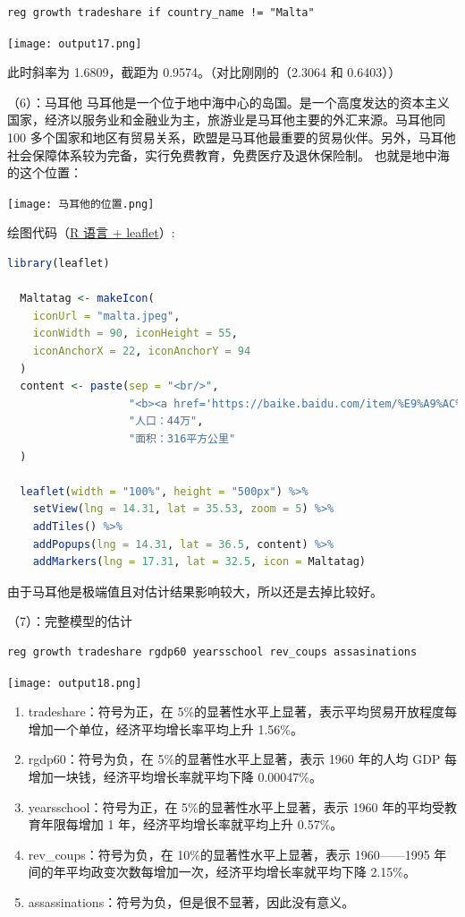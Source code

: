 \documentclass[cn,fancy,blue,11pt]{elegantbook}
\begin{document}
\begin{lstlisting}
reg growth tradeshare if country_name != "Malta"
\end{lstlisting}

\noindent\texttt{[image: output17.png]}

此时斜率为 1.6809，截距为 0.9574。（对比刚刚的（2.3064 和 0.6403））

（6）：马耳他
马耳他是一个位于地中海中心的岛国。是一个高度发达的资本主义国家，经济以服务业和金融业为主，旅游业是马耳他主要的外汇来源。马耳他同 100 多个国家和地区有贸易关系，欧盟是马耳他最重要的贸易伙伴。另外，马耳他社会保障体系较为完备，实行免费教育，免费医疗及退休保险制。
也就是地中海的这个位置：

\noindent\texttt{[image: 马耳他的位置.png]}

绘图代码（\href{https://rstudio.github.io/leaflet/}{R 语言 + leaflet}）:

\begin{lstlisting}[language=R]
  library(leaflet)

  Maltatag <- makeIcon(
    iconUrl = "malta.jpeg",
    iconWidth = 90, iconHeight = 55,
    iconAnchorX = 22, iconAnchorY = 94
  )
  content <- paste(sep = "<br/>",
                   "<b><a href='https://baike.baidu.com/item/%E9%A9%AC%E8%80%B3%E4%BB%96'>马耳他</a></b>",
                   "人口：44万",
                   "面积：316平方公里"
  )

  leaflet(width = "100%", height = "500px") %>%
    setView(lng = 14.31, lat = 35.53, zoom = 5) %>%
    addTiles() %>%
    addPopups(lng = 14.31, lat = 36.5, content) %>%
    addMarkers(lng = 17.31, lat = 32.5, icon = Maltatag)
\end{lstlisting}

由于马耳他是极端值且对估计结果影响较大，所以还是去掉比较好。

（7）：完整模型的估计

\begin{lstlisting}
reg growth tradeshare rgdp60 yearsschool rev_coups assasinations
\end{lstlisting}

\noindent\texttt{[image: output18.png]}

\begin{enumerate}
\item
  tradeshare：符号为正，在 5\%的显著性水平上显著，表示平均贸易开放程度每增加一个单位，经济平均增长率平均上升 1.56\%。
\item
  rgdp60：符号为负，在 5\%的显著性水平上显著，表示 1960 年的人均 GDP 每增加一块钱，经济平均增长率就平均下降 0.00047\%。
\item
  yearsschool：符号为正，在 5\%的显著性水平上显著，表示 1960 年的平均受教育年限每增加 1 年，经济平均增长率就平均上升 0.57\%。
\item
  rev\_coups：符号为负，在 10\%的显著性水平上显著，表示 1960------1995 年间的年平均政变次数每增加一次，经济平均增长率就平均下降 2.15\%。
\item
  assassinations：符号为负，但是很不显著，因此没有意义。
\end{enumerate}
\end{document}
